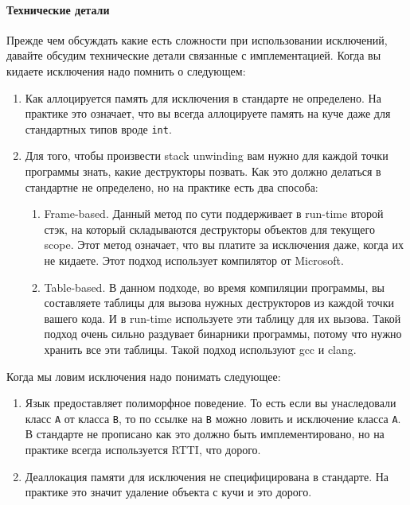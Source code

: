 \paragraph{Технические детали}

Прежде чем обсуждать какие есть сложности при использовании исключений, давайте обсудим технические детали связанные с имплементацией.
Когда вы кидаете исключения надо помнить о следующем:
\begin{enumerate}
\item Как аллоцируется память для исключения в стандарте не определено.
На практике это означает, что вы всегда аллоцируете память на куче даже для стандартных типов вроде \verb"int".

\item Для того, чтобы произвести stack unwinding вам нужно для каждой точки программы знать, какие деструкторы позвать.
Как это должно делаться в стандартне не определено, но на практике есть два способа:
\begin{enumerate}
\item Frame-based.
Данный метод по сути поддерживает в run-time второй стэк, на который складываются деструкторы объектов для текущего scope.
Этот метод означает, что вы платите за исключения даже, когда их не кидаете.
Этот подход использует компилятор от Microsoft.

\item Table-based.
В данном подходе, во время компиляции программы, вы составляете таблицы для вызова нужных деструкторов из каждой точки вашего кода.
И в run-time используете эти таблицу для их вызова.
Такой подход очень сильно раздувает бинарники программы, потому что нужно хранить все эти таблицы.
Такой подход используют gcc и clang.
\end{enumerate}
\end{enumerate}
Когда мы ловим исключения надо понимать следующее:
\begin{enumerate}
\item Язык предоставляет полиморфное поведение.
То есть если вы унаследовали класс \verb"A" от класса \verb"B", то по ссылке на \verb"B" можно ловить и исключение класса \verb"A".
В стандарте не прописано как это должно быть имплементировано, но на практике всегда используется RTTI, что дорого.

\item Деаллокация памяти для исключения не специфицирована в стандарте.
На практике это значит удаление объекта с кучи и это дорого.
\end{enumerate}

